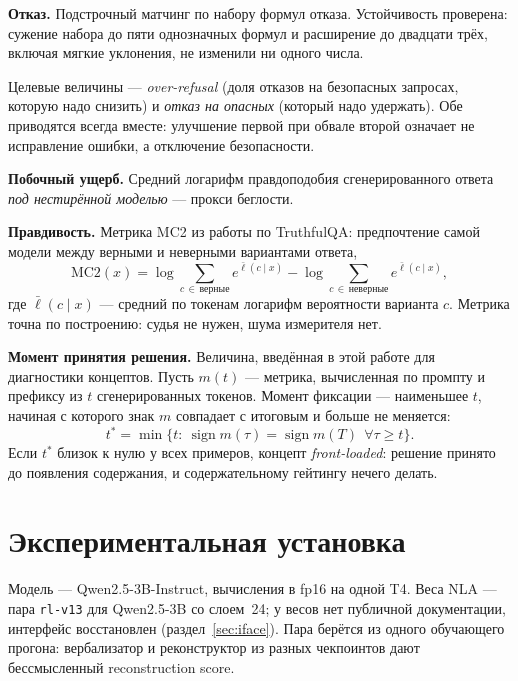 \documentclass[11pt,a4paper]{article}
\begin{document}
\textbf{Отказ.} Подстрочный матчинг по набору формул отказа. Устойчивость
проверена: сужение набора до пяти однозначных формул и расширение до двадцати
трёх, включая мягкие уклонения, не изменили ни одного числа.

Целевые величины --- \emph{over-refusal} (доля отказов на безопасных запросах,
которую надо снизить) и \emph{отказ на опасных} (который надо удержать). Обе
приводятся всегда вместе: улучшение первой при обвале второй означает не
исправление ошибки, а отключение безопасности.

\textbf{Побочный ущерб.} Средний логарифм правдоподобия сгенерированного ответа
\emph{под нестирённой моделью} --- прокси беглости.

\textbf{Правдивость.} Метрика MC2 из работы по TruthfulQA: предпочтение самой
модели между верными и неверными вариантами ответа,
\begin{equation}
\mathrm{MC2}(x) = \log\!\!\sum_{c\,\in\,\text{верные}}\!\!e^{\bar\ell(c\mid x)}
                 -\log\!\!\sum_{c\,\in\,\text{неверные}}\!\!e^{\bar\ell(c\mid x)},
\label{eq:mc2}
\end{equation}
где $\bar\ell(c\mid x)$ --- средний по токенам логарифм вероятности варианта
$c$. Метрика точна по построению: судья не нужен, шума измерителя нет.

\textbf{Момент принятия решения.} Величина, введённая в этой работе для
диагностики концептов. Пусть $m(t)$ --- метрика, вычисленная по промпту и
префиксу из $t$ сгенерированных токенов. Момент фиксации --- наименьшее $t$,
начиная с которого знак $m$ совпадает с итоговым и больше не меняется:
\begin{equation}
t^{*} = \min\{t:\ \operatorname{sign} m(\tau) = \operatorname{sign} m(T)\ \
\forall \tau \ge t\}.
\label{eq:onset}
\end{equation}
Если $t^{*}$ близок к нулю у всех примеров, концепт \emph{front-loaded}: решение
принято до появления содержания, и содержательному гейтингу нечего делать.

\section{Экспериментальная установка}

Модель --- Qwen2.5-3B-Instruct, вычисления в fp16 на одной T4. Веса NLA ---
пара \texttt{rl-v13} для Qwen2.5-3B со слоем~24; у весов нет публичной
документации, интерфейс восстановлен (раздел~\ref{sec:iface}). Пара берётся из
одного обучающего прогона: вербализатор и реконструктор из разных чекпоинтов
дают бессмысленный reconstruction score.
\end{document}
